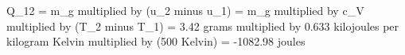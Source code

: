 Q_12 = m_g multiplied by (u_2 minus u_1) = m_g multiplied by c_V multiplied by (T_2 minus T_1) = 3.42 grams multiplied by 0.633 kilojoules per kilogram Kelvin multiplied by (500 Kelvin) = -1082.98 joules